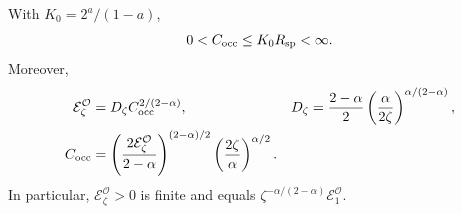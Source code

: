 \begin{proposition}
  \label{P:raw-occupation-energy}
  With $K_0 = 2^a/(1-a)$,
  \[
    0<C_{\rm occ}\le K_0R_{\mathrm{sp}}<\infty .
  \]
  Moreover,
  \begin{align}
    \mathcal{E}_\zeta^{\mathcal{O}}
    &=D_\zeta C_{\rm occ}^{2/(2-\alpha)},&
    D_\zeta&=\frac{2-\alpha}{2}
    \left(\frac{\alpha}{2\zeta}\right)^{\alpha/(2-\alpha)},
    \label{E:raw-occupation-energy}\\
    C_{\rm occ}
    &=\left(\frac{2\mathcal{E}_\zeta^{\mathcal{O}}}{2-\alpha}\right)^{(2-\alpha)/2}
    \left(\frac{2\zeta}{\alpha}\right)^{\alpha/2}.
    \label{E:raw-occupation-ratio}
  \end{align}
  In particular, $\mathcal{E}_\zeta^{\mathcal{O}} > 0$ is finite and equals
  $\zeta^{-\alpha/(2-\alpha)}\mathcal{E}_1^{\mathcal{O}}$.
\end{proposition}

